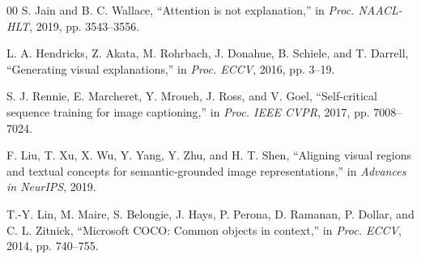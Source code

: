 \documentclass[conference]{IEEEtran}
\begin{document}
\begin{thebibliography}{00}
S. Jain and B. C. Wallace, ``Attention is not explanation,'' in \textit{Proc. NAACL-HLT}, 2019, pp. 3543--3556.

L. A. Hendricks, Z. Akata, M. Rohrbach, J. Donahue, B. Schiele, and T. Darrell, ``Generating visual explanations,'' in \textit{Proc. ECCV}, 2016, pp. 3--19.

S. J. Rennie, E. Marcheret, Y. Mroueh, J. Ross, and V. Goel, ``Self-critical sequence training for image captioning,'' in \textit{Proc. IEEE CVPR}, 2017, pp. 7008--7024.

F. Liu, T. Xu, X. Wu, Y. Yang, Y. Zhu, and H. T. Shen, ``Aligning visual regions and textual concepts for semantic-grounded image representations,'' in \textit{Advances in NeurIPS}, 2019.

T.-Y. Lin, M. Maire, S. Belongie, J. Hays, P. Perona, D. Ramanan, P. Dollar, and C. L. Zitnick, ``Microsoft COCO: Common objects in context,'' in \textit{Proc. ECCV}, 2014, pp. 740--755.

\end{thebibliography}
\end{document}
